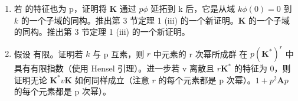\begin{enumerate}
\def\labelenumi{(\alph{enumi})}
\setcounter{enumi}{1}
\item
  若  的特征也为 p，证明将 \(\mathbf{K}\) 通过 \(p\)\(\phi\) 延拓到 k 后，它是从域 \(k\)\(\phi(0) = 0\) 到 \(k\) 的一个子域的同构。推出第 3 节定理 1 (iii) 的一个新证明。\(\mathbf{K}\) 的一个子域的同构。推出第 3 节定理 1 (iii) 的一个新证明。
\item
  假设  有限。证明若 \(k\) 与 p 互素，则 \(r\) 中元素的 r 次幂所成群  在 \(p\)\((\mathbf{K}^*)^r\) 中具有有限指数（使用 Hensel 引理）。进一步若 v 离散且 \(r\)\(\mathbf{K}^*\) 的特征为 0，则证明无论 \(\mathbf{K}^*\)\(v\)\(\mathbf{K}\) 如何同样成立（注意 \(r\) 的每个元素都是 p 次幂）。\(1 + p^2\mathbf{A}\)\(p\) 的每个元素都是 p 次幂）。
\end{enumerate}

